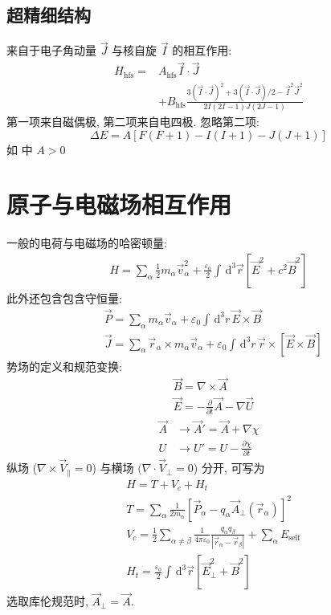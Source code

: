 \documentclass[10pt,a4paper,twocolumn]{article} %
\numberwithin{equation}{section} %
\newcommand{\dif}{\,\mathrm d}
\begin{document}
\subsection{超精细结构} %
\label{sub:hperfine_splitting}
来自于电子角动量 $\vec J$ 与核自旋 $\vec I$ 的相互作用: 
\begin{equation}
\begin{aligned}
	H_{\mathrm{hfs}} = & A_{\mathrm{hfs}}\vec I\cdot\vec J \\
	& + B_{\mathrm{hfs}}\frac{3(\vec I\cdot\vec J)^2 + 3(\vec I\cdot\vec J)/2
	- \vec I^2\vec J^2}{2I(2I-1)J(2J-1)}
\end{aligned}	
\end{equation}
第一项来自磁偶极, 第二项来自电四极. 忽略第二项: 
\begin{equation}
	\Delta E = A \left[F(F+1) - I(I+1) - J(J+1)\right]
\end{equation}
如 中 $A > 0$
\section{原子与电磁场相互作用} %
\label{sec:int_with_emf}
一般的电荷与电磁场的哈密顿量: 
\begin{align}
	H = \sum_\alpha \frac 12 m_\alpha\vec v_\alpha^2
	+\frac{\varepsilon_0}2\int\dif^3\vec r\left[\vec E^2 + c^2\vec B^2\right]
\end{align}
此外还包含包含守恒量: 
\begin{align}
	& \vec P = \sum_\alpha m_\alpha\vec v_\alpha + 
	\varepsilon_0\int\dif^3 r\, \vec E\times\vec B \\
	& \vec J = \sum_\alpha\vec r_\alpha\times m_\alpha\vec v_\alpha + 
	\varepsilon_0\int\dif^3 r\, \vec r \times\left[\vec E\times\vec B\right]
\end{align}
势场的定义和规范变换: 
\begin{align}
	&\vec B = \nabla\times\vec A \\
	&\vec E = -\frac{\partial}{\partial t}\vec A - \nabla\vec U 
\end{align}
\begin{align}
	\vec A &\to \vec A' = \vec A + \nabla\chi \\
	U &\to U' = U - \frac{\partial \chi}{\partial t}
\end{align}
纵场 ($\nabla\times \vec V_\parallel = 0$) 
与横场 $(\nabla\cdot\vec V_\perp = 0$) 分开, 可写为
\begin{align}
	&H = T + V_c + H_t  \\
	&T = \sum_\alpha\frac{1}{2m_\alpha}
	\left[\vec P_\alpha - q_\alpha\vec A_\perp(\vec r_\alpha)\right]^2\\
	&V_c = \frac 12\sum_{\alpha\neq\beta} \frac{1}{4\pi\varepsilon_0}
	 \frac{q_\alpha q_\beta}{|\vec r_\alpha - \vec r_\beta|} + 
	 \sum_\alpha E_{\mathrm{self}} \\
	&H_t = \frac{\varepsilon_0}2\int\dif^3\vec r
	 \left[\vec E_\perp^2 + \vec B^2\right]
\end{align}
选取库伦规范时, $\vec A_\perp = \vec A$. 
\end{document}
